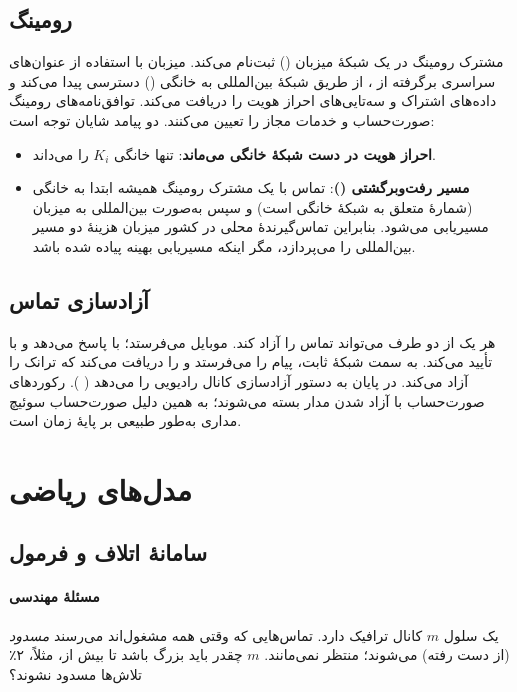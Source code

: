 \documentclass[11pt,a4paper]{article}
\begin{document}
\subsection{رومینگ}
مشترک رومینگ در یک شبکهٔ میزبان () ثبت‌نام می‌کند.  میزبان با استفاده از
عنوان‌های سراسری برگرفته از ، از طریق شبکهٔ بین‌المللی  به  خانگی
() دسترسی پیدا می‌کند و داده‌های اشتراک و سه‌تایی‌های احراز هویت را دریافت می‌کند.
توافق‌نامه‌های رومینگ صورت‌حساب و خدمات مجاز را تعیین می‌کنند. دو پیامد شایان توجه است:
\begin{itemize}
  \item \textbf{احراز هویت در دست شبکهٔ خانگی می‌ماند}: تنها  خانگی $K_i$ را می‌داند.
  \item \textbf{مسیر رفت‌وبرگشتی ()}: تماس با یک مشترک رومینگ همیشه ابتدا به
         خانگی (شمارهٔ  متعلق به شبکهٔ خانگی است) و سپس به‌صورت
        بین‌المللی به  میزبان مسیریابی می‌شود. بنابراین تماس‌گیرندهٔ محلی در کشور
        میزبان هزینهٔ دو مسیر بین‌المللی را می‌پردازد، مگر اینکه مسیریابی بهینه پیاده شده باشد.
\end{itemize}

\subsection{آزادسازی تماس}
هر یک از دو طرف می‌تواند تماس را آزاد کند. موبایل  می‌فرستد؛  با
 پاسخ می‌دهد و  با  تأیید می‌کند. به سمت شبکهٔ ثابت،
 پیام   را می‌فرستد و  را دریافت می‌کند که ترانک را آزاد
می‌کند. در پایان  به  دستور آزادسازی کانال رادیویی را می‌دهد
( ). رکوردهای صورت‌حساب با آزاد شدن مدار بسته می‌شوند؛ به همین
دلیل صورت‌حساب سوئیچ مداری به‌طور طبیعی بر پایهٔ زمان است.

\section{مدل‌های ریاضی}

\subsection{سامانهٔ اتلاف و فرمول }\label{sec:erlangb}
\paragraph{مسئلهٔ مهندسی} یک سلول $m$ کانال ترافیک دارد. تماس‌هایی که وقتی همه مشغول‌اند
می‌رسند \emph{مسدود} (از دست رفته) می‌شوند؛ منتظر نمی‌مانند. $m$ چقدر باید بزرگ باشد تا
بیش از، مثلاً، ۲٪ تلاش‌ها مسدود نشوند؟
\end{document}

